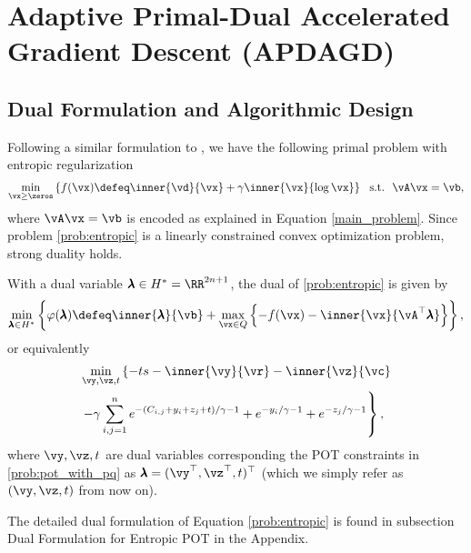 \section{Adaptive Primal-Dual Accelerated Gradient Descent (APDAGD)}

\subsection{Dual Formulation and Algorithmic Design}
Following a similar formulation to \citep[Section 3.1]{Dvurechensky-2018-Computational}, we have the following primal problem with entropic regularization
\begin{align}
    \label{prob:entropic}
    \min_{\vx \geq \zeros} \left\{ f(\vx) \defeq \inner{\vd}{\vx} + \gamma \inner{\vx }{\log \vx} \right\} ~~ \text{s.t.} ~~  \vA \vx = \vb,
\end{align}
where $\vA \vx = \vb$ is encoded as explained in Equation \eqref{main_problem}. Since problem \eqref{prob:entropic} is a linearly constrained convex optimization problem, strong duality holds.
\begin{lemma}
    With a dual variable $\pmb{\lambda} \in H^{*} = \RR^{2n+1}$, the dual of \eqref{prob:entropic} is given by
        $$\min_{\pmb{\lambda} \in H^{*}} \left\{ \varphi(\pmb{\lambda}) \defeq \inner{\pmb{\lambda}}{\vb} + \max_{\vx \in Q} \left\{ - f(\vx) - \inner{\vx}{\vA^\top \pmb{\lambda}}\right\} \right\},$$
    or equivalently
    \begin{align}
    \label{entropic_regularized}
        \begin{split}
        &\min_{\vy, \vz, t} \left\{- ts - \inner{\vy}{\vr} - \inner{\vz}{\vc}  \right. \\
        &\left. - \gamma \sum_{i, j=1}^{n} e^{-(C_{i, j} + y_i + z_j + t)/{\gamma}-1} + e^{-y_i / \gamma - 1} +  e^{-z_j/ \gamma - 1}  \right\},
        \end{split}
\end{align}
     where $\vy, \vz, t$ are dual variables corresponding the POT constraints in \eqref{prob:pot_with_pq} as $\pmb{\lambda} = (\vy^\top, \vz^\top, t)^\top$ (which we simply refer as $(\vy, \vz, t)$ from now on).
\end{lemma}
The detailed dual formulation of Equation \eqref{prob:entropic} is found in subsection Dual Formulation for Entropic POT in the Appendix.

